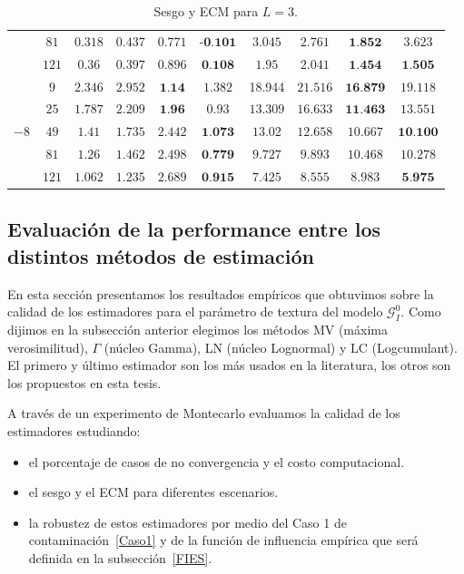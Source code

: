 \begin{table}[hbt]
\begin{tabular}{cc|cccc|cccc}
		& $81$	& $0.318$	& $0.437$	& $0.771$	 			 & $\textbf{-0.101}$	& $3.045$	    & $2.761$	    & $\textbf{1.852}$	 & $3.623$ \\ 
		& $121$	& $0.36$	& $0.397$	& $0.896$	 			 & $\textbf{0.108}$	    & $1.95$	    & $2.041$	    & $\textbf{1.454}$	 & $\textbf{1.505}$ \\ 
		\cmidrule(r){1-6}
		\cmidrule(r){7-10}									
		\multirow{5 }{*}{$-8$}									
		& $9$	& $2.346$	& $2.952$   & $\textbf{1.14}$     	& $1.382$				& 18.944		& $21.516$	& $\textbf{16.879}$	 & $19.118$ \\ 
		& $25$	& $1.787$	& $2.209$	& $\textbf{1.96}$		& $0.93$				& $13.309$	 	& $16.633$	& $\textbf{11.463}$	 & $13.551$ \\ 
		& $49$	& $1.41$	& $1.735$	& $2.442$				& $\textbf{1.073}$		& $13.02$	    & $12.658$  & $10.667$	         & $\textbf{10.100}$ \\ 
		& $81$	& $1.26$	& $1.462$	& $2.498$				& $\textbf{0.779}$		& $9.727$	    & $9.893$	& $10.468$	 		 & $10.278$  \\ 
		& $121$	& $1.062$	& $1.235$	& $2.689$				& $\textbf{0.915}$		& $7.425$	    & $8.555$	& $8.983$	         & $\textbf{5.975}$  \\ 
 		\bottomrule 								
	\end{tabular}										
	\caption{\label{SesgoyECMSinContConConstL=3} Sesgo y ECM para $L=3$.}									
\end{table}										


\subsection{Evaluación de la performance entre los distintos métodos de estimación}

En esta sección presentamos los resultados empíricos que obtuvimos sobre la calidad de los estimadores para el parámetro de textura del modelo $\mathcal G_I^0$. Como dijimos en la subsección anterior elegimos los métodos MV (máxima verosimilitud), $\Gamma$ (núcleo Gamma), LN (núcleo Lognormal) y LC (Logcumulant). El primero y último estimador son los más usados en la literatura, los otros son los propuestos en esta tesis.

A través de un experimento de Montecarlo evaluamos la calidad de los estimadores estudiando:
\begin{itemize}
	\item el porcentaje de casos de no convergencia y el costo computacional.
	\item el sesgo y el ECM para diferentes escenarios.
	\item la robustez de estos estimadores por medio del Caso 1 de contaminación~\ref{Caso1} y de la función de influencia empírica que será definida en la subsección~\ref{FIES}.
\end{itemize} 

